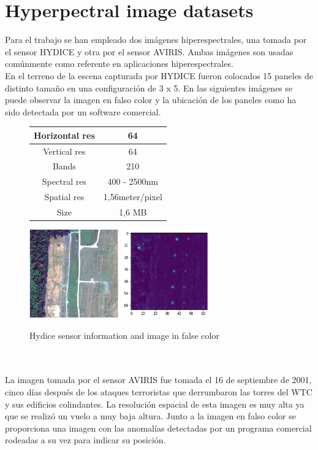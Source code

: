 \section{Hyperpectral image datasets}
Para el trabajo se han empleado dos imágenes hiperespectrales, una tomada por el sensor HYDICE y otra por el sensor AVIRIS. Ambas imágenes son usadas comúnmente como referente en aplicaciones hiperespectrales. 
\\
En el terreno de la escena capturada por HYDICE fueron colocados 15 paneles de distinto tamaño en una configuración de 3 x 5. En las siguientes imágenes se puede observar la imagen en falso color y la ubicación de los paneles como ha sido detectada por un software comercial.
\begin{figure}[!ht]
    \begin{tabular}[b]{c|c}\hline
      Horizontal res & 64 \\ \hline
      Vertical res & 64 \\ \hline
      Bands & 210 \\ \hline
      Spectral res & 400 - 2500nm \\ \hline
      Spatial res & 1,56meter/pixel \\ \hline
      Size & 1,6 MB\\ \hline
    \end{tabular}
\includegraphics[height=1.5in]{figures/hydice_bad.png}
\includegraphics[height=1.5in]{figures/hydice_rx.png}
    \caption{Hydice sensor information and image in false color}
  \end{figure}
\\
\\
La imagen tomada por el sensor AVIRIS fue tomada el 16 de septiembre de 2001, cinco días después de los ataques terroristas que derrumbaron las torres del WTC y sus edificios colindantes. La resolución espacial de esta imagen es muy alta ya que se realizó un vuelo a muy baja altura. Junto a la imagen en falso color se proporciona una imagen con las anomalías detectadas por un programa comercial rodeadas a su vez para indicar su posición.
